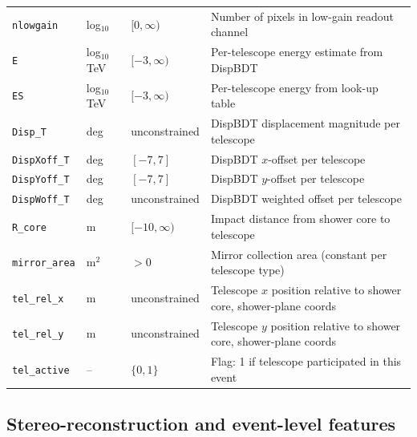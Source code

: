 \documentclass[12pt]{article}
\begin{document}
\begin{longtable}{lll p{5.5cm}}
\texttt{nlowgain} & log$_{10}$ & $[0,\infty)$ & Number of pixels in low-gain readout channel \\
\texttt{E} & log$_{10}$ TeV & $[-3,\infty)$ & Per-telescope energy estimate from DispBDT \\
\texttt{ES} & log$_{10}$ TeV & $[-3,\infty)$ & Per-telescope energy from look-up table \\
\texttt{Disp\_T} & deg & unconstrained & DispBDT displacement magnitude per telescope \\
\texttt{DispXoff\_T} & deg & $[-7,7]$ & DispBDT $x$-offset per telescope \\
\texttt{DispYoff\_T} & deg & $[-7,7]$ & DispBDT $y$-offset per telescope \\
\texttt{DispWoff\_T} & deg & unconstrained & DispBDT weighted offset per telescope \\
\texttt{R\_core} & m & $[-10,\infty)$ & Impact distance from shower core to telescope \\
\texttt{mirror\_area} & m$^2$ & $>0$ & Mirror collection area (constant per telescope type) \\
\texttt{tel\_rel\_x} & m & unconstrained & Telescope $x$ position relative to shower core, shower-plane coords \\
\texttt{tel\_rel\_y} & m & unconstrained & Telescope $y$ position relative to shower core, shower-plane coords \\
\texttt{tel\_active} & -- & $\{0,1\}$ & Flag: 1 if telescope participated in this event \\
\end{longtable}

\subsection{Stereo-reconstruction and event-level features}
\end{document}
